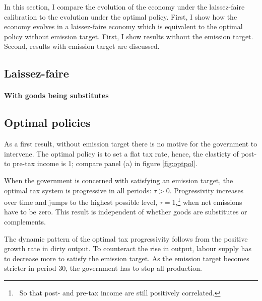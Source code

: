 In this section, I compare the evolution of the economy under the laissez-faire calibration to the evolution under the optimal policy. First, I show how the economy evolves in a laissez-faire economy which is equivalent to the optimal policy without emission target. First, I show results without the emission target. Second, results with emission target are discussed.
\subsection{Laissez-faire}

\paragraph{With goods being substitutes}
\subsection{Optimal policies}
As a first result, without emission target there is no motive for the government to intervene. The optimal policy is to set a flat tax rate, hence, the elasticty of post- to pre-tax income is 1; compare panel (a) in figure \ref{fig:optpol}. 

When the government is concerned with satisfying an emission target, the optimal tax system is progressive in all periods: $\tau >0$. Progressivity increases over time and jumps to the highest  possible level, $\tau=1$,\footnote{\ So that post- and pre-tax income are still positively correlated.} when net emissions have to be zero. This result is independent of whether goods are substitutes or complements.   

The dynamic pattern of the optimal tax progressivity follows from the positive growth rate in dirty output. To counteract the rise in output, labour supply has to decrease more to satisfy the emission target. As the emission target becomes stricter in period 30, the government has to stop all production. 

